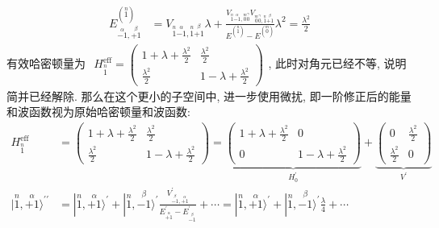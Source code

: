 \documentclass[../../main.tex]{subfiles}
\begin{document}
\begin{enumerate}
\begin{align*}
        E^{(\stackrel{n}{1})}_{\stackrel{\alpha}{-1},\stackrel{\beta}{+1}} &=
        V_{\stackrel{n}{1}\stackrel{\alpha}{-1},\stackrel{n}{1}\stackrel{\beta}{+1}}\lambda + \frac{V_{\stackrel{n}{1}\stackrel{\alpha}{-1},\stackrel{m}{0}\stackrel{\gamma}{0}}V_{\stackrel{m}{0}\stackrel{\gamma}{0},\stackrel{n}{1}\stackrel{\beta}{+1}}}{E^{(\stackrel{n}{1})} - E^{(\stackrel{m}{0})}}\lambda^{2} =  \frac{\lambda^{2}}{2}
    \end{align*}
    有效哈密顿量为 $\begin{aligned}
        H_{\stackrel{n}{1}}^{\text{eff}} = \begin{pmatrix}
            1 + \lambda + \frac{\lambda^{2}}{2} & \frac{\lambda^{2}}{2}\\
            \frac{\lambda^{2}}{2} & 1 - \lambda + \frac{\lambda^{2}}{2}
        \end{pmatrix}
    \end{aligned}$, 此时对角元已经不等, 说明简并已经解除. 那么在这个更小的子空间中, 进一步使用微扰, 即一阶修正后的能量和波函数视为原始哈密顿量和波函数:
    \begin{align*}
        H_{\stackrel{n}{1}}^{\text{eff}} &= \begin{pmatrix}
            1 + \lambda + \frac{\lambda^{2}}{2} & \frac{\lambda^{2}}{2}\\
            \frac{\lambda^{2}}{2} & 1 - \lambda + \frac{\lambda^{2}}{2}
        \end{pmatrix} = \underbrace{\begin{pmatrix}
            1 + \lambda + \frac{\lambda^{2}}{2}  & 0\\
            0 & 1 - \lambda + \frac{\lambda^{2}}{2}
        \end{pmatrix}}_{H_{0}^{\prime}} + \underbrace{\begin{pmatrix}
            0 & \frac{\lambda^{2}}{2}\\
            \frac{\lambda^{2}}{2} & 0
        \end{pmatrix}}_{V^{\prime}}\\
        |\stackrel{n}{1},\stackrel{\alpha}{+1}\rangle^{\prime\prime} &= |\stackrel{n}{1},\stackrel{\alpha}{+1}\rangle^{\prime} + |\stackrel{n}{1},\stackrel{\beta}{-1}\rangle^{\prime}\frac{V^{\prime}_{\stackrel{\beta}{-1},\stackrel{\alpha}{+1}}}{E^{\prime}_{\stackrel{\alpha}{+1}} - E^{\prime}_{\stackrel{\beta}{-1}}} + \cdots
        = |\stackrel{n}{1},\stackrel{\alpha}{+1}\rangle^{\prime} + |\stackrel{n}{1},\stackrel{\beta}{-1}\rangle^{\prime}\frac{\lambda}{4} + \cdots\\

\end{align*}
\end{enumerate}
\end{document}
